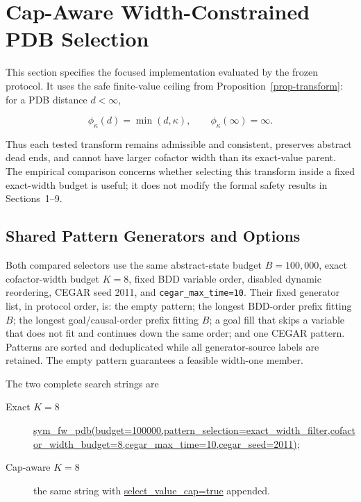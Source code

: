 \section{Cap-Aware Width-Constrained PDB Selection}
\label{sec:supp-cap-selection}

This section specifies the focused implementation evaluated by the frozen
protocol.  It uses the safe finite-value ceiling from
Proposition~\ref{prop-transform}: for a PDB distance \(d<\infty\),

\[
  \phi_\kappa(d)=\min(d,\kappa),
  \qquad \phi_\kappa(\infty)=\infty.
\]

Thus each tested transform remains admissible and consistent, preserves
abstract dead ends, and cannot have larger cofactor width than its exact-value
parent.  The empirical comparison concerns whether selecting this transform
inside a fixed exact-width budget is useful; it does not modify the formal
safety results in Sections~1--9.

\subsection{Shared Pattern Generators and Options}

Both compared selectors use the same abstract-state budget
\(B=100{,}000\), exact cofactor-width budget \(K=8\), fixed BDD variable
order, disabled dynamic reordering, CEGAR seed 2011, and
\texttt{cegar\_max\_time=10}.  Their fixed generator list, in protocol order,
is: the empty pattern; the longest BDD-order prefix fitting \(B\); the longest
goal/causal-order prefix fitting \(B\); a goal fill that skips a variable that
does not fit and continues down the same order; and one CEGAR pattern.  Patterns
are sorted and deduplicated while all generator-source labels are retained.
The empty pattern guarantees a feasible width-one member.

The two complete search strings are

\begin{sloppypar}
\small
\raggedright
\begin{description}
  \item[Exact \(K=8\)]
    \url{sym_fw_pdb(budget=100000,pattern_selection=exact_width_filter,cofactor_width_budget=8,cegar_max_time=10,cegar_seed=2011)};
  \item[Cap-aware \(K=8\)] the same string with
    \url{select_value_cap=true} appended.
\end{description}
\end{sloppypar}

